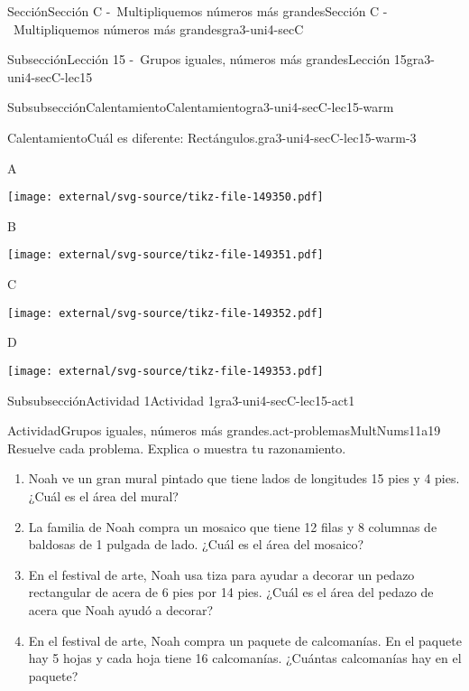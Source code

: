 \documentclass[twoside,10pt,]{article}
\begin{document}
\begin{sectionptx}{Sección}{Sección C -~Multipliquemos números más grandes}{}{Sección C -~Multipliquemos números más grandes}{}{}{gra3-uni4-secC}
\begin{subsectionptx}{Subsección}{Lección 15 -~Grupos iguales, números más grandes}{}{Lección 15}{}{}{gra3-uni4-secC-lec15}
\begin{subsubsectionptx}{Subsubsección}{Calentamiento}{}{Calentamiento}{}{}{gra3-uni4-secC-lec15-warm}
\begin{exploration}{Calentamiento}{Cuál es diferente: Rectángulos.}{gra3-uni4-secC-lec15-warm-3}
\begin{sidebyside}{2}{0}{0}{0}
\begin{sbspanel}{0.5}%
A%
\par
\texttt{[image: external/svg-source/tikz-file-149350.pdf]}
\end{sbspanel}%
\begin{sbspanel}{0.5}%
B%
\par
\texttt{[image: external/svg-source/tikz-file-149351.pdf]}
\end{sbspanel}%
\end{sidebyside}%
\begin{sidebyside}{2}{0}{0}{0}%
\begin{sbspanel}{0.5}%
C%
\par
\texttt{[image: external/svg-source/tikz-file-149352.pdf]}
\end{sbspanel}%
\begin{sbspanel}{0.5}%
D%
\par
\texttt{[image: external/svg-source/tikz-file-149353.pdf]}
\end{sbspanel}%
\end{sidebyside}%
\end{exploration}%
\end{subsubsectionptx}
%
%
\typeout{************************************************}
\typeout{************************************************}
%
\begin{subsubsectionptx}{Subsubsección}{Actividad 1}{}{Actividad 1}{}{}{gra3-uni4-secC-lec15-act1}
\begin{activity}{Actividad}{Grupos iguales, números más grandes.}{act-problemasMultNums11a19}%
Resuelve cada problema. Explica o muestra tu razonamiento.%
%
\begin{enumerate}
\item{}Noah ve un gran mural pintado que tiene lados de longitudes 15 pies y 4 pies. ¿Cuál es el área del mural?%
\item{}La familia de Noah compra un mosaico que tiene 12 filas y 8 columnas de baldosas de 1 pulgada de lado. ¿Cuál es el área del mosaico?%
\item{}En el festival de arte, Noah usa tiza para ayudar a decorar un pedazo rectangular de acera de 6 pies por 14 pies. ¿Cuál es el área del pedazo de acera que Noah ayudó a decorar?%
\item{}En el festival de arte, Noah compra un paquete de calcomanías. En el paquete hay 5 hojas y cada hoja tiene 16 calcomanías. ¿Cuántas calcomanías hay en el paquete?%

\end{enumerate}
\end{activity}
\end{subsubsectionptx}
\end{subsectionptx}
\end{sectionptx}
\end{document}
